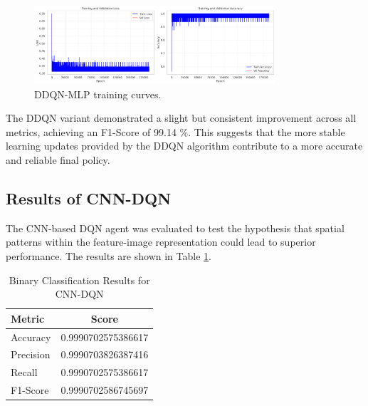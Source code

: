 \documentclass[12pt]{report}
\begin{document}
\vspace{0.5cm}

\begin{figure}[htbp]
    \centering
    \includegraphics[width=0.8\textwidth]{images/double_dqn_nn_training_curves.png}
    \caption{DDQN-MLP training curves.}
    \label{fig:ddqn_nn_training_curves}
\end{figure}

The DDQN variant demonstrated a slight but consistent improvement across all metrics, achieving an F1-Score of 99.14 \%. This suggests that the more stable learning updates provided by the DDQN algorithm contribute to a more accurate and reliable final policy.

\newpage
\subsection{Results of CNN-DQN}
The CNN-based DQN agent was evaluated to test the hypothesis that spatial patterns within the feature-image representation could lead to superior performance. The results are shown in Table \ref{tab:binary_cnn_dqn_results}.

\begin{table}[H]
    \centering
    \caption{Binary Classification Results for CNN-DQN}
    \label{tab:binary_cnn_dqn_results}
    \begin{tabular}{@{}lc@{}}
        \toprule
        \textbf{Metric} & \textbf{Score} \\
        \midrule
        Accuracy & 0.9990702575386617 \\
        Precision & 0.9990703826387416 \\
        Recall & 0.9990702575386617 \\
        F1-Score & 0.9990702586745697 \\
        \bottomrule
    \end{tabular}
\end{table}
\end{document}
